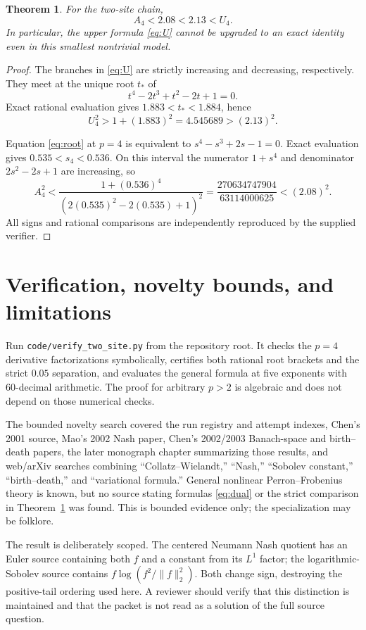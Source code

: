 \documentclass[11pt]{article}
\newtheorem{theorem}{Theorem}
\begin{document}
\begin{theorem}\label{thm:gap}
For the two-site chain,
\[
 A_4<2.08<2.13<U_4.
\]
In particular, the upper formula \eqref{eq:U} cannot be upgraded to an exact
identity even in this smallest nontrivial model.
\end{theorem}

\begin{proof}
The branches in \eqref{eq:U} are strictly increasing and decreasing,
respectively.  They meet at the unique root $t_*$ of
\[
 t^4-2t^3+t^2-2t+1=0.
\]
Exact rational evaluation gives $1.883<t_*<1.884$, hence
\[
 U_4^2>1+(1.883)^2=4.545689>(2.13)^2.
\]

Equation \eqref{eq:root} at $p=4$ is equivalent to
$s^4-s^3+2s-1=0$.  Exact evaluation gives
$0.535<s_4<0.536$.  On this interval the numerator $1+s^4$ and denominator
$2s^2-2s+1$ are increasing, so
\[
 A_4^2<
 \frac{1+(0.536)^4}{(2(0.535)^2-2(0.535)+1)^2}
 =\frac{270634747904}{63114000625}
 <(2.08)^2.
\]
All signs and rational comparisons are independently reproduced by the
supplied verifier.
\end{proof}

\section{Verification, novelty bounds, and limitations}
Run \texttt{code/verify\_two\_site.py} from the repository root.  It checks
the $p=4$ derivative factorizations symbolically, certifies both rational root
brackets and the strict $0.05$ separation, and evaluates the general formula
at five exponents with 60-decimal arithmetic.  The proof for arbitrary
$p>2$ is algebraic and does not depend on those numerical checks.

The bounded novelty search covered the run registry and attempt indexes,
Chen's 2001 source, Mao's 2002 Nash paper, Chen's 2002/2003 Banach-space and
birth--death papers, the later monograph chapter summarizing those results,
and web/arXiv searches combining ``Collatz--Wielandt,'' ``Nash,'' ``Sobolev
constant,'' ``birth--death,'' and ``variational formula.''  General nonlinear
Perron--Frobenius theory is known, but no source stating formulas
\eqref{eq:dual} or the strict comparison in Theorem~\ref{thm:gap} was found.
This is bounded evidence only; the specialization may be folklore.

The result is deliberately scoped.  The centered Neumann Nash quotient has
an Euler source containing both $f$ and a constant from its $L^1$ factor;
the logarithmic-Sobolev source contains
$f\log(f^2/\|f\|_2^2)$.  Both change sign, destroying the positive-tail
ordering used here.  A reviewer should verify that this distinction is
maintained and that the packet is not read as a solution of the full source
question.
\end{document}
